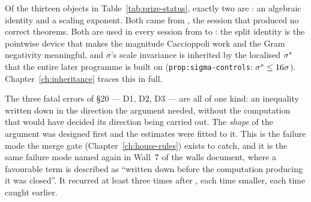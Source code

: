 \begin{obsv}
\label{obs:prize-survivors}
Of the thirteen objects in Table~\ref{tab:prize-status}, exactly two are
\PROVED: an algebraic identity and a scaling exponent. Both came from ,
the session that produced no correct theorems. Both are used in every session
from  to : the split identity is the pointwise device that makes
the  magnitude Caccioppoli work and the  Gram negativity
meaningful, and \(\sigma\)'s scale invariance is inherited by the localised
\(\sigma^{*}\) that the entire later programme is built on
(\texttt{prop:sigma-controls}: \(\sigma^{*}\le16\sigma\)).
Chapter~\ref{ch:inheritance} traces this in full.
\end{obsv}

\begin{obsv}
\label{obs:prize-failure-mode}
The three fatal errors of \S20 --- D1, D2, D3 --- are all of one kind: an
inequality written down in the direction the argument needed, without the
computation that would have decided its direction being carried out. The
\emph{shape} of the argument was designed first and the estimates were fitted
to it. This is the failure mode the  merge gate
(Chapter~\ref{ch:house-rules}) exists to catch, and it is the same failure
mode named again in Wall~7 of the walls document, where a favourable term is
described as ``written down before the computation producing it was closed''.
It recurred at least three times after , each time smaller, each time
caught earlier.
\end{obsv}
